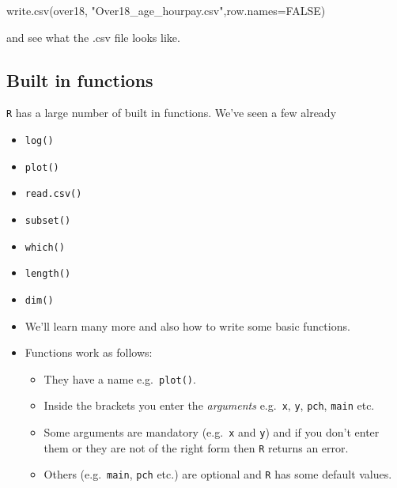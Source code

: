 \documentclass[
]{gitbook}
\newenvironment{Shaded}{\begin{snugshade}}{\end{snugshade}}
\newcommand{\AttributeTok}[1]{\textcolor[rgb]{0.77,0.63,0.00}{#1}}
\newcommand{\ConstantTok}[1]{\textcolor[rgb]{0.00,0.00,0.00}{#1}}
\newcommand{\FunctionTok}[1]{\textcolor[rgb]{0.00,0.00,0.00}{#1}}
\newcommand{\NormalTok}[1]{#1}
\newcommand{\StringTok}[1]{\textcolor[rgb]{0.31,0.60,0.02}{#1}}
\providecommand{\tightlist}{%
  \setlength{\itemsep}{0pt}\setlength{\parskip}{0pt}}
\begin{document}
\begin{Shaded}
\begin{Highlighting}[]
\FunctionTok{write.csv}\NormalTok{(over18, }\StringTok{"Over18\_age\_hourpay.csv"}\NormalTok{,}\AttributeTok{row.names=}\ConstantTok{FALSE}\NormalTok{)}
\end{Highlighting}
\end{Shaded}

and see what the .csv file looks like.

\hypertarget{built-in-functions}{%
\subsection{Built in functions}\label{built-in-functions}}

\texttt{R} has a large number of built in functions. We've seen a few already

\begin{itemize}
\item
  \texttt{log()}
\item
  \texttt{plot()}
\item
  \texttt{read.csv()}
\item
  \texttt{subset()}
\item
  \texttt{which()}
\item
  \texttt{length()}
\item
  \texttt{dim()}
\item
  We'll learn many more and also how to write some basic functions.
\item
  Functions work as follows:

  \begin{itemize}
  \tightlist
  \item
    They have a name e.g.~\texttt{plot()}.\\
  \item
    Inside the brackets you enter the \emph{arguments} e.g.~\texttt{x}, \texttt{y}, \texttt{pch}, \texttt{main} etc.\\
  \item
    Some arguments are mandatory (e.g.~\texttt{x} and \texttt{y}) and if you don't enter them or they are not of the right form then \texttt{R} returns an error.\\
  \item
    Others (e.g.~\texttt{main}, \texttt{pch} etc.) are optional and \texttt{R} has some default values.
  \end{itemize}
\end{itemize}
\end{document}
